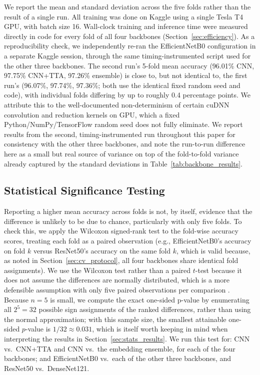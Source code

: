 \documentclass[11pt]{article}
\begin{document}
We report the mean and standard deviation across the five folds rather than the result of a single run. All training was done on Kaggle using a single Tesla T4 GPU, with batch size 16. Wall-clock training and inference time were measured directly in code for every fold of all four backbones (Section~\ref{sec:efficiency}). As a reproducibility check, we independently re-ran the EfficientNetB0 configuration in a separate Kaggle session, through the same timing-instrumented script used for the other three backbones. The second run's 5-fold mean accuracy (96.01\% CNN, 97.75\% CNN+TTA, 97.26\% ensemble) is close to, but not identical to, the first run's (96.07\%, 97.74\%, 97.36\%; both use the identical fixed random seed and code), with individual folds differing by up to roughly 0.4 percentage points. We attribute this to the well-documented non-determinism of certain cuDNN convolution and reduction kernels on GPU, which a fixed Python/NumPy/TensorFlow random seed does not fully eliminate. We report results from the second, timing-instrumented run throughout this paper for consistency with the other three backbones, and note the run-to-run difference here as a small but real source of variance on top of the fold-to-fold variance already captured by the standard deviations in Table~\ref{tab:backbone_results}.

\subsection{Statistical Significance Testing}
\label{sec:stats_protocol}
Reporting a higher mean accuracy across folds is not, by itself, evidence that the difference is unlikely to be due to chance, particularly with only five folds. To check this, we apply the Wilcoxon signed-rank test \cite{wilcoxon1945} to the fold-wise accuracy scores, treating each fold as a paired observation (e.g., EfficientNetB0's accuracy on fold $k$ versus ResNet50's accuracy on the same fold $k$, which is valid because, as noted in Section~\ref{sec:cv_protocol}, all four backbones share identical fold assignments). We use the Wilcoxon test rather than a paired $t$-test because it does not assume the differences are normally distributed, which is a more defensible assumption with only five paired observations per comparison \cite{demsar2006statistical}. Because $n=5$ is small, we compute the exact one-sided p-value by enumerating all $2^5=32$ possible sign assignments of the ranked differences, rather than using the normal approximation; with this sample size, the smallest attainable one-sided $p$-value is $1/32 \approx 0.031$, which is itself worth keeping in mind when interpreting the results in Section~\ref{sec:stats_results}. We run this test for: CNN vs.\ CNN+TTA and CNN vs.\ the embedding ensemble, for each of the four backbones; and EfficientNetB0 vs.\ each of the other three backbones, and ResNet50 vs.\ DenseNet121.
\end{document}
